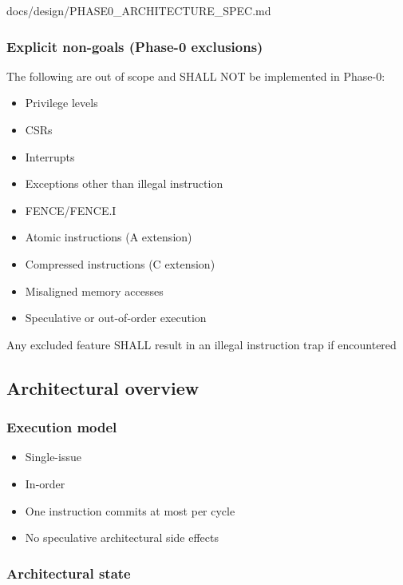 \begin{relocated}{docs/design/PHASE0_ARCHITECTURE_SPEC.md}
\subsubsection{Explicit non-goals (Phase-0 exclusions)}\label{ds:ch:phase0-architecture:explicit-non-goals-phase-0-exclusions}

The following are out of scope and SHALL NOT be implemented in Phase-0:

\begin{itemize}
\tightlist
\item
  Privilege levels
\item
  CSRs
\item
  Interrupts
\item
  Exceptions other than illegal instruction
\item
  FENCE/\allowbreak{}FENCE.I
\item
  Atomic instructions (A extension)
\item
  Compressed instructions (C extension)
\item
  Misaligned memory accesses
\item
  Speculative or out-of-order execution
\end{itemize}

Any excluded feature SHALL result in an illegal instruction trap if
encountered

\subsection{Architectural overview}\label{ds:ch:phase0-architecture:architectural-overview}

\subsubsection{Execution model}\label{ds:ch:phase0-architecture:execution-model}

\begin{itemize}
\tightlist
\item
  Single-issue
\item
  In-order
\item
  One instruction commits at most per cycle
\item
  No speculative architectural side effects
\end{itemize}

\subsubsection{Architectural state}\label{ds:ch:phase0-architecture:architectural-state}


\end{relocated}
